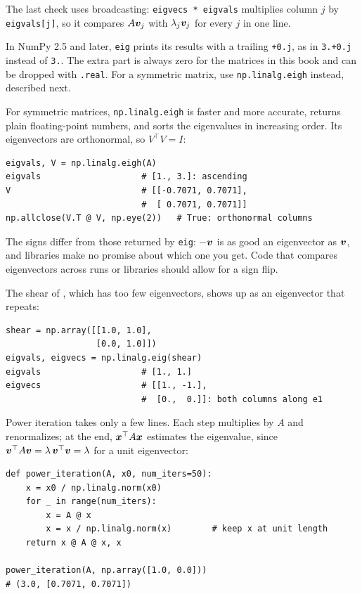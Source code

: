 The last check uses broadcasting: \texttt{eigvecs * eigvals} multiplies
column $j$ by \texttt{eigvals[j]}, so it compares $A\bm{v}_j$ with
$\lambda_j\bm{v}_j$ for every $j$ in one line.

\begin{note}
  In NumPy 2.5 and later, \texttt{eig} prints its results with a trailing
  \texttt{+0.j}, as in \texttt{3.+0.j} instead of \texttt{3.}. The extra
  part is always zero for the matrices in this book and can be dropped
  with \texttt{.real}. For a symmetric matrix, use
  \texttt{np.linalg.eigh} instead, described next.
\end{note}

For symmetric matrices, \texttt{np.linalg.eigh} is faster and more
accurate, returns plain floating-point numbers, and sorts the eigenvalues in
increasing order. Its eigenvectors are orthonormal, so
$V^\top V = I$:

\begin{lstlisting}
eigvals, V = np.linalg.eigh(A)
eigvals                    # [1., 3.]: ascending
V                          # [[-0.7071, 0.7071],
                           #  [ 0.7071, 0.7071]]
np.allclose(V.T @ V, np.eye(2))   # True: orthonormal columns
\end{lstlisting}

The signs differ from those returned by \texttt{eig}: $-\bm{v}$ is as
good an eigenvector as $\bm{v}$, and libraries make no promise about
which one you get. Code that compares eigenvectors across runs or
libraries should allow for a sign flip.

The shear of , which has too few
eigenvectors, shows up as an eigenvector that repeats:

\begin{lstlisting}
shear = np.array([[1.0, 1.0],
                  [0.0, 1.0]])
eigvals, eigvecs = np.linalg.eig(shear)
eigvals                    # [1., 1.]
eigvecs                    # [[1., -1.],
                           #  [0.,  0.]]: both columns along e1
\end{lstlisting}

Power iteration takes only a few lines. Each step multiplies by $A$ and
renormalizes; at the end, $\bm{x}^\top A \bm{x}$ estimates the
eigenvalue, since $\bm{v}^\top A \bm{v} = \lambda\, \bm{v}^\top
\bm{v} = \lambda$ for a unit eigenvector:

\begin{lstlisting}
def power_iteration(A, x0, num_iters=50):
    x = x0 / np.linalg.norm(x0)
    for _ in range(num_iters):
        x = A @ x
        x = x / np.linalg.norm(x)        # keep x at unit length
    return x @ A @ x, x

power_iteration(A, np.array([1.0, 0.0]))
# (3.0, [0.7071, 0.7071])
\end{lstlisting}

